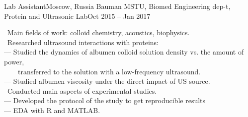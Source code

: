\resumeSubheading
    {Lab Assistant}{Moscow, Russia}
    {Bauman MSTU, Biomed Engineering dep-t, Protein and Ultrasonic Lab}{Oct 2015 -- Jan 2017}
    \begin{itemize}[leftmargin=0in, label={}]
        \small{\item{
            {\textbullet \ Main fields of work: colloid chemistry, acoustics, biophysics.}\\
            {\textbullet \ Researched ultrasound interactions with proteins:}\\
            {— Studied the dynamics of albumen colloid solution density vs. the amount of power,} \\ {\ \ \ \ transferred to the solution with a low-frequency ultrasound.}\\
            {— Studied albumen viscosity under the direct  impact of US source.}\\
            {\textbullet \ Conducted main aspects of experimental studies.}\\
            {— Developed the protocol of the study to get reproducible results}\\
            {— EDA with R and MATLAB.}\\
        }}
    \end{itemize}